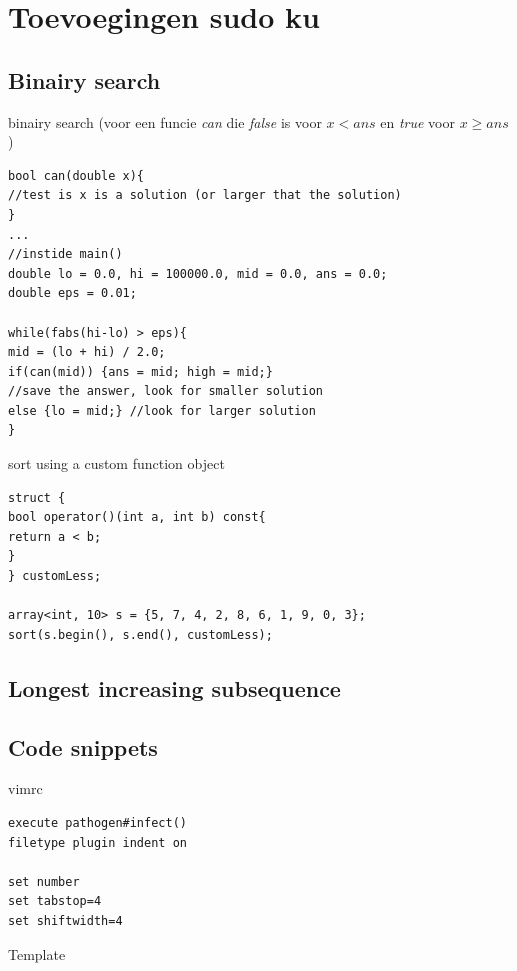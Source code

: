 \documentclass[10pt,a4paper,titlepage]{article}
\begin{document}


\section{Toevoegingen sudo ku}



\subsection{Binairy search}
binairy search (voor een funcie \emph{can} die \emph{false} is voor $x < ans$ en \emph{true} voor $x\geq ans$)

\begin{lstlisting}
bool can(double x){
//test is x is a solution (or larger that the solution)
}
...
//instide main()
double lo = 0.0, hi = 100000.0, mid = 0.0, ans = 0.0;
double eps = 0.01;

while(fabs(hi-lo) > eps){
mid = (lo + hi) / 2.0;
if(can(mid)) {ans = mid; high = mid;} 
//save the answer, look for smaller solution
else {lo = mid;} //look for larger solution
}
\end{lstlisting}
sort using a custom function object
\begin{lstlisting}
struct {
bool operator()(int a, int b) const{   
return a < b;
}   
} customLess;

array<int, 10> s = {5, 7, 4, 2, 8, 6, 1, 9, 0, 3}; 
sort(s.begin(), s.end(), customLess);
\end{lstlisting}


\subsection{Longest increasing subsequence}


\subsection{Code snippets}


vimrc
\begin{lstlisting}[morekeywords={set,execute}]
execute pathogen#infect()
filetype plugin indent on

set number
set tabstop=4
set shiftwidth=4
\end{lstlisting}


Template

\end{document}
